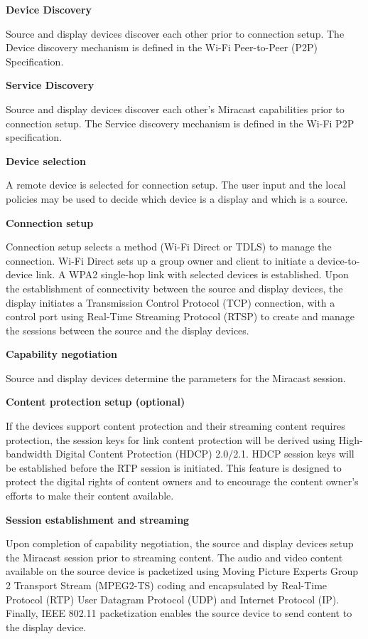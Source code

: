 \textbf{Device Discovery}

Source and display devices discover each other prior to connection setup. The Device discovery mechanism is defined in the Wi-Fi Peer-to-Peer (P2P) Specification.

\textbf{Service Discovery}

Source and display devices discover each other's Miracast capabilities prior to connection setup. The Service discovery mechanism is defined in the Wi-Fi P2P specification.

\textbf{Device selection}

A remote device is selected for connection setup. The user input and the local policies may be used to decide which device is a display and which is a source.

\textbf{Connection setup}

Connection setup selects a method (Wi-Fi Direct or TDLS) to manage the connection. Wi-Fi Direct sets up a group owner and client to initiate a device-to-device link. A WPA2 single-hop link with selected devices is established. Upon the establishment of connectivity between the source and display devices, the display initiates a Transmission Control Protocol (TCP) connection, with a control port using Real-Time Streaming Protocol (RTSP) to create and manage the sessions between the source and the display devices.

\textbf{Capability negotiation} 

Source and display devices determine the parameters for the Miracast session. 

\textbf{Content protection setup (optional)}

If the devices support content protection and their streaming content requires
protection, the session keys for link content protection will be derived using High-bandwidth Digital Content Protection (HDCP) 2.0/2.1. HDCP session keys will be established before the RTP session is initiated. This feature is designed to protect the digital rights of content owners and to encourage the content owner's efforts to make their content available.

\textbf{Session establishment and streaming}

Upon completion of capability negotiation, the source and display devices setup the Miracast session prior to streaming content. The audio and video content available on the source device is packetized 
using Moving Picture Experts Group 2 Transport Stream (MPEG2-TS) coding and encapsulated by Real-Time Protocol (RTP) User Datagram Protocol (UDP) and Internet Protocol (IP). Finally, IEEE 802.11 packetization enables the source device to send content to the display device.


